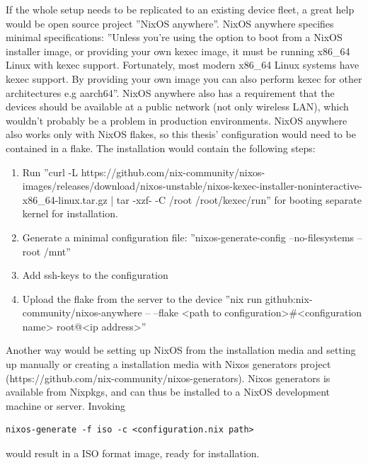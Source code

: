 If the whole setup needs to be replicated to an existing device fleet, a great help would be open source project ''NixOS anywhere''. NixOS anywhere specifies minimal specifications: ''Unless you're using the option to boot from a NixOS installer image, or providing your own kexec image, it must be running x86\_64 Linux with kexec support. Fortunately, most modern x86\_64 Linux systems have kexec support. By providing your own image you can also perform kexec for other architectures e.g aarch64''. NixOS anywhere also has a requirement that the devices should be available at a public network (not only wireless LAN), which wouldn't probably be a problem in production environments. NixOS anywhere also works only with NixOS flakes, so this thesis' configuration would need to be contained in a flake. \cite{githubGitHubNixcommunitynixosanywhere}
The installation would contain the following steps:
\begin{enumerate}
  \item Run ''curl -L https://github.com/nix-community/nixos-images/releases/download/nixos-unstable/nixos-kexec-installer-noninteractive-x86\_64-linux.tar.gz | tar -xzf- -C /root
/root/kexec/run'' for booting separate kernel for installation.
  \item Generate a minimal configuration file: ''nixos-generate-config --no-filesystems --root /mnt''
  \item Add ssh-keys to the configuration
  \item Upload the flake from the server to the device ''nix run github:nix-community/nixos-anywhere -- --flake <path to configuration>#<configuration name> root@<ip address>''
\end{enumerate}
Another way would be setting up NixOS from the installation media and setting up manually or creating a installation media with Nixos generators project (https://github.com/nix-community/nixos-generators). Nixos generators is available from Nixpkgs, and can thus be installed to a NixOS development machine or server. Invoking 
\begin{lstlisting}
nixos-generate -f iso -c <configuration.nix path>
\end{lstlisting}
would result in a ISO format image, ready for installation. \cite{githubGitHubNixcommunitynixosanywhere}